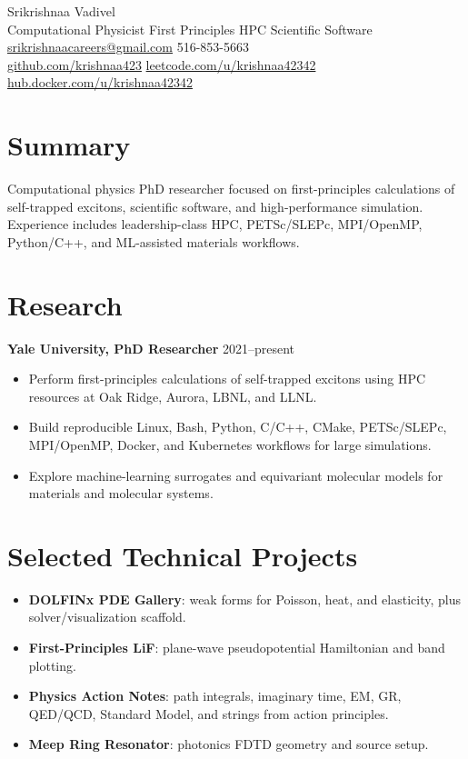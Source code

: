 \documentclass[10pt]{article}
\begin{document}
\begin{center}
{\LARGE Srikrishnaa Vadivel}\\
Computational Physicist \textbar{} First Principles \textbar{} HPC \textbar{} Scientific Software\\
\href{mailto:srikrishnaacareers@gmail.com}{srikrishnaacareers@gmail.com} \textbar{} 516-853-5663\\
\href{https://github.com/krishnaa423}{github.com/krishnaa423} \textbar{}
\href{https://leetcode.com/u/krishnaa42342/}{leetcode.com/u/krishnaa42342} \textbar{}
\href{https://hub.docker.com/u/krishnaa42342}{hub.docker.com/u/krishnaa42342}
\end{center}
\section{Summary}
Computational physics PhD researcher focused on first-principles calculations
of self-trapped excitons, scientific software, and high-performance simulation.
Experience includes leadership-class HPC, PETSc/SLEPc, MPI/OpenMP, Python/C++,
and ML-assisted materials workflows.
\section{Research}
\textbf{Yale University, PhD Researcher} \hfill 2021--present
\begin{itemize}
\item Perform first-principles calculations of self-trapped excitons using HPC
resources at Oak Ridge, Aurora, LBNL, and LLNL.
\item Build reproducible Linux, Bash, Python, C/C++, CMake, PETSc/SLEPc,
MPI/OpenMP, Docker, and Kubernetes workflows for large simulations.
\item Explore machine-learning surrogates and equivariant molecular models for
materials and molecular systems.
\end{itemize}
\section{Selected Technical Projects}
\begin{itemize}
\item \textbf{DOLFINx PDE Gallery}: weak forms for Poisson, heat, and
elasticity, plus solver/visualization scaffold.
\item \textbf{First-Principles LiF}: plane-wave pseudopotential Hamiltonian and
band plotting.
\item \textbf{Physics Action Notes}: path integrals, imaginary time, EM, GR,
QED/QCD, Standard Model, and strings from action principles.
\item \textbf{Meep Ring Resonator}: photonics FDTD geometry and source setup.
\end{itemize}
\end{document}
